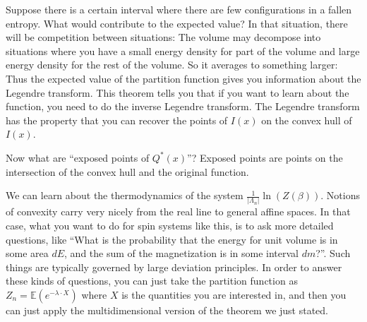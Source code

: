 Suppose there is a certain interval where there are few configurations in a fallen entropy. What would contribute to the expected value? In that situation, there will be competition between situations: The volume may decompose into situations where you have a small energy density for part of the volume and large energy density for the rest of the volume. So it averages to something larger: Thus the expected value of the partition function gives you information about the Legendre transform. This theorem tells you that if you want to learn about the function, you need to do the inverse Legendre transform. The Legendre transform has the property that you can recover the points of $I(x)$ on the convex hull of $I(x)$. 

Now what are ``exposed points of $Q^*(x)$''? Exposed points are points on the intersection of the convex hull and the original function. 

We can learn about the thermodynamics of the system $\frac{1}{|\Lambda_n|}\ln(Z(\beta))$. Notions of convexity carry very nicely from the real line to general affine spaces. In that case, what you want to do for spin systems like this, is to ask more detailed questions, like ``What is the probability that the energy for unit volume is in some area $dE$, and the sum of the magnetization is in some interval $dm$?''. Such things are typically governed by large deviation principles. 
In order to answer these kinds of questions, you can just take the partition function as $Z_n = \mathbb{E}(e^{-\lambda \cdot X})$ where $X$ is the quantities you are interested in, and then you can just apply the multidimensional version of the theorem we just stated. 




